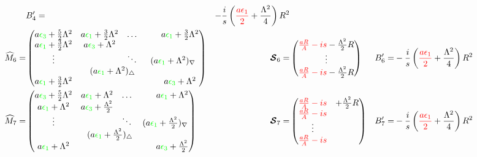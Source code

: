 \documentclass[aps,prd,onecolumn
,tightenlines,letterpaper,
notitlepage,11pt,
nofootinbib]{revtex4-1}
\begin{document}
\begin{align*}
&
B'_4=&-\frac{i}{s}\left(\red{\frac{a\epsilon_1}{2}}+\frac{\Lambda^2}{4}\right)R^2
\\
\cM_6 =&
\begin{pmatrix}
a\green{\epsilon_3}+\frac{5}{2}\Lambda^2 & a\green{\epsilon_1}+\frac{3}{2}\Lambda^2 & 
\multicolumn{2}{l}{\ldots} &a\green{\epsilon_1}+\frac{3}{2}\Lambda^2 \\ 
a\green{\epsilon_1}+\frac{3}{2}\Lambda^2 & a\green{\epsilon_3}+\Lambda^2 & & &\\
\vdots&& \ddots\;\;\; &\multicolumn{2}{c}{\!\!\!\!(a\green{\epsilon_1}+\Lambda^2)_\nabla}\\
 &\multicolumn{2}{c}{(a\green{\epsilon_1}+\Lambda^2)_\triangle} &  & \\
  a\green{\epsilon_1}+\frac{3}{2}\Lambda^2& & & & a\green{\epsilon_3}+\Lambda^2 \\
\end{pmatrix}
&
\ve{\cS}_6 =&\begin{pmatrix}\red{\frac{aR}{A}-is}-\frac{\Lambda^2}{2}R\\ \vdots\\
\red{\frac{aR}{A}-is}-\frac{\Lambda^2}{2}R\end{pmatrix}
&
B'_6=&-\frac{i}{s}\left(\red{\frac{a\epsilon_1}{2}}+\frac{\Lambda^2}{4}\right)R^2
\\
\cM_7 =&
\begin{pmatrix}
a\green{\epsilon_3}+\frac{5}{2}\Lambda^2 & a\green{\epsilon_1}+\Lambda^2 & 
\multicolumn{2}{l}{\ldots} &a\green{\epsilon_1}+\Lambda^2 \\ 
a\green{\epsilon_1}+\Lambda^2 & a\green{\epsilon_3}+\frac{\Lambda^2}{2} & & &\\
\vdots&& \ddots\;\;\; &\multicolumn{2}{c}{\!\!\!\!(a\green{\epsilon_1}+\frac{\Lambda^2}{2})_\nabla}\\
 &\multicolumn{2}{c}{(a\green{\epsilon_1}+\frac{\Lambda^2}{2})_\triangle} &  & \\
  a\green{\epsilon_1}+\Lambda^2& & & & a\green{\epsilon_3}+\frac{\Lambda^2}{2} \\
\end{pmatrix}
&
\ve{\cS}_7 =&\begin{pmatrix}\red{\frac{aR}{A}-is}&+\frac{\Lambda^2}{2}R\\\red{\frac{aR}{A}-is}&\\ \vdots&\\
\red{\frac{aR}{A}-is}&\end{pmatrix}
&
B'_7=&-\frac{i}{s}\left(\red{\frac{a\epsilon_1}{2}}+\frac{\Lambda^2}{4}\right)R^2
\\

\end{align*}
\end{document}
